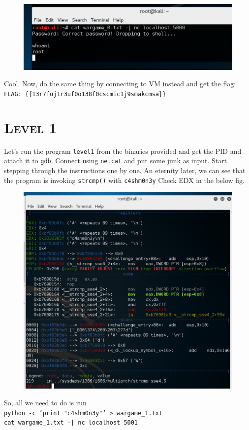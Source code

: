 \documentclass[12pt, bibliography=totocnumbered]{article}
\newcommand{\ssection}[1]{%
  \section[#1]{\centering\normalfont\scshape #1}}
\begin{document}
\begin{figure}[H]
\centerline{\includegraphics[width=1\textwidth]{img/0/2.png}}
\end{figure}
Cool. Now, do the same thing by connecting to VM instead and get the flag:
\newline
\texttt{FLAG: \{\{13r7fuj1r3uf0o138f0cscmic1j9smakcmsa\}\}}
\newpage
\ssection{\textbf{Level 1}}
Let's run the program \texttt{level1} from the binaries provided and get the PID and attach it to \texttt{gdb}. Connect using \texttt{netcat} and put some junk as input. 
Start stepping through the instructions one by one. An eternity later, we can see that the program is invoking \texttt{strcmp()} with \texttt{c4shm0n3y}
Check EDX in the below fig.
\begin{figure}[H]
\centerline{\includegraphics[width=1\textwidth]{img/1/1.png}}
\end{figure}
\newpage
So, all we need to do is run \\ \texttt{python -c 'print "c4shm0n3y"' > wargame\_1.txt}\\ \texttt{cat wargame\_1.txt -| nc localhost 5001}
\end{document}
